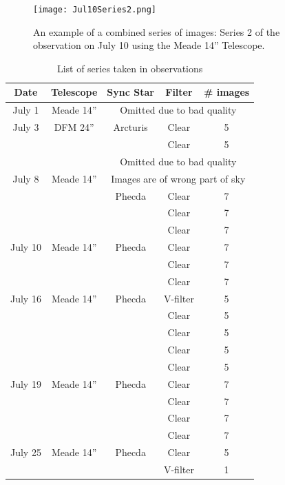 \documentclass[12pt,journal,compsoc]{IEEEtran}
\begin{document}
\begin{figure}[!t]
\centering
\texttt{[image: Jul10Series2.png]}
\caption{An example of a combined series of images: Series 2 of the observation on July 10 using the Meade 14'' Telescope.\label{fig:exampleseries}}
\label{fig_sim}
\end{figure}

\begin{table}[!t]
\centering
\begin{tabular}{|c|c|c|c|c|}
\hline
Date & Telescope & Sync Star & Filter & \# images \\ \hline \hline
July 1 &Meade 14''& \multicolumn{3}{c|}{Omitted due to bad quality}\\ \hline \hline
July 3 & DFM 24''& Arcturis & Clear & 5 \\ \cline{4-5}
 & & & Clear & 5\\ \cline{3-5}
 & & \multicolumn{3}{c|}{Omitted due to bad quality} \\ \hline \hline
July 8 & Meade 14'' &\multicolumn{3}{c|}{Images are of wrong part of sky} \\ \cline{3-5}
 & & Phecda & Clear & 7 \\ \cline{4-5}
 & & & Clear & 7\\ \cline{4-5}
 & & & Clear & 7\\ \hline \hline
July 10 & Meade 14''& Phecda & Clear &7 \\ \cline{4-5}
 & & & Clear & 7\\ \cline{4-5}
 & & & Clear & 7\\ \hline \hline
July 16 & Meade 14''& Phecda & V-filter &5 \\ \cline{4-5}
 & & & Clear & 5\\ \cline{4-5}
 & & & Clear & 5\\ \cline{4-5}
 & & & Clear & 5\\ \cline{4-5}
 & & & Clear & 5\\ \hline \hline
July 19 & Meade 14''& Phecda & Clear &7 \\ \cline{4-5}
 & & & Clear & 7\\ \cline{4-5}
 & & & Clear & 7\\ \cline{4-5}
 & & & Clear & 7\\ \hline \hline
July 25 & Meade 14'' & Phecda & Clear &5 \\ \cline{4-5}
 & & & V-filter & 1\\ \hline
\end{tabular}
\caption{List of series taken in observations \label{tab:serieslist}}
\end{table}
\end{document}
